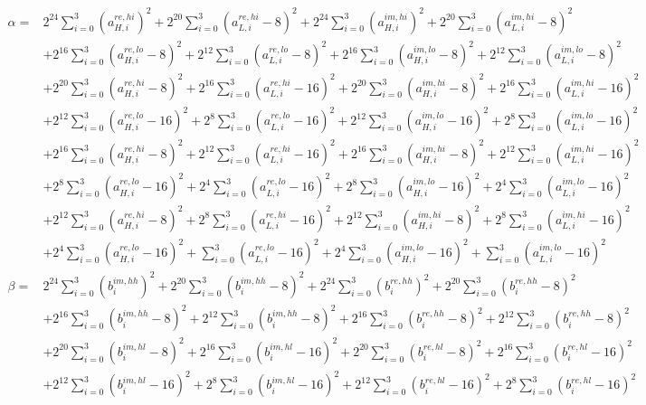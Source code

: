 \documentclass[fleqn]{article}
\begin{document}
{\[{\begin{aligned}
\alpha ={}& 2^{24}\!\sum_{i=0}^{3}(a_{H,i}^{re,hi})^2 + 2^{20}\!\sum_{i=0}^{3}(a_{L,i}^{re,hi}{-}8)^2 + 2^{24}\!\sum_{i=0}^{3}(a_{H,i}^{im,hi})^2 + 2^{20}\!\sum_{i=0}^{3}(a_{L,i}^{im,hi}{-}8)^2 \\
  & + 2^{16}\!\sum_{i=0}^{3}(a_{H,i}^{re,lo}{-}8)^2 + 2^{12}\!\sum_{i=0}^{3}(a_{L,i}^{re,lo}{-}8)^2 + 2^{16}\!\sum_{i=0}^{3}(a_{H,i}^{im,lo}{-}8)^2 + 2^{12}\!\sum_{i=0}^{3}(a_{L,i}^{im,lo}{-}8)^2 \\
  & + 2^{20}\!\sum_{i=0}^{3}(a_{H,i}^{re,hi}{-}8)^2 + 2^{16}\!\sum_{i=0}^{3}(a_{L,i}^{re,hi}{-}16)^2 + 2^{20}\!\sum_{i=0}^{3}(a_{H,i}^{im,hi}{-}8)^2 + 2^{16}\!\sum_{i=0}^{3}(a_{L,i}^{im,hi}{-}16)^2 \\
  & + 2^{12}\!\sum_{i=0}^{3}(a_{H,i}^{re,lo}{-}16)^2 + 2^{8}\!\sum_{i=0}^{3}(a_{L,i}^{re,lo}{-}16)^2 + 2^{12}\!\sum_{i=0}^{3}(a_{H,i}^{im,lo}{-}16)^2 + 2^{8}\!\sum_{i=0}^{3}(a_{L,i}^{im,lo}{-}16)^2 \\
  & + 2^{16}\!\sum_{i=0}^{3}(a_{H,i}^{re,hi}{-}8)^2 + 2^{12}\!\sum_{i=0}^{3}(a_{L,i}^{re,hi}{-}16)^2 + 2^{16}\!\sum_{i=0}^{3}(a_{H,i}^{im,hi}{-}8)^2 + 2^{12}\!\sum_{i=0}^{3}(a_{L,i}^{im,hi}{-}16)^2 \\
  & + 2^{8}\!\sum_{i=0}^{3}(a_{H,i}^{re,lo}{-}16)^2 + 2^{4}\!\sum_{i=0}^{3}(a_{L,i}^{re,lo}{-}16)^2 + 2^{8}\!\sum_{i=0}^{3}(a_{H,i}^{im,lo}{-}16)^2 + 2^{4}\!\sum_{i=0}^{3}(a_{L,i}^{im,lo}{-}16)^2 \\
  & + 2^{12}\!\sum_{i=0}^{3}(a_{H,i}^{re,hi}{-}8)^2 + 2^{8}\!\sum_{i=0}^{3}(a_{L,i}^{re,hi}{-}16)^2 + 2^{12}\!\sum_{i=0}^{3}(a_{H,i}^{im,hi}{-}8)^2 + 2^{8}\!\sum_{i=0}^{3}(a_{L,i}^{im,hi}{-}16)^2 \\
  & + 2^{4}\!\sum_{i=0}^{3}(a_{H,i}^{re,lo}{-}16)^2 + \sum_{i=0}^{3}(a_{L,i}^{re,lo}{-}16)^2 + 2^{4}\!\sum_{i=0}^{3}(a_{H,i}^{im,lo}{-}16)^2 + \sum_{i=0}^{3}(a_{L,i}^{im,lo}{-}16)^2 \\[0.35em]
\beta ={}& 2^{24}\!\sum_{i=0}^{3}(b_i^{im,hh})^2 + 2^{20}\!\sum_{i=0}^{3}(b_i^{im,hh}{-}8)^2 + 2^{24}\!\sum_{i=0}^{3}(b_i^{re,hh})^2 + 2^{20}\!\sum_{i=0}^{3}(b_i^{re,hh}{-}8)^2 \\
  & + 2^{16}\!\sum_{i=0}^{3}(b_i^{im,hh}{-}8)^2 + 2^{12}\!\sum_{i=0}^{3}(b_i^{im,hh}{-}8)^2 + 2^{16}\!\sum_{i=0}^{3}(b_i^{re,hh}{-}8)^2 + 2^{12}\!\sum_{i=0}^{3}(b_i^{re,hh}{-}8)^2 \\
  & + 2^{20}\!\sum_{i=0}^{3}(b_i^{im,hl}{-}8)^2 + 2^{16}\!\sum_{i=0}^{3}(b_i^{im,hl}{-}16)^2 + 2^{20}\!\sum_{i=0}^{3}(b_i^{re,hl}{-}8)^2 + 2^{16}\!\sum_{i=0}^{3}(b_i^{re,hl}{-}16)^2 \\
  & + 2^{12}\!\sum_{i=0}^{3}(b_i^{im,hl}{-}16)^2 + 2^{8}\!\sum_{i=0}^{3}(b_i^{im,hl}{-}16)^2 + 2^{12}\!\sum_{i=0}^{3}(b_i^{re,hl}{-}16)^2 + 2^{8}\!\sum_{i=0}^{3}(b_i^{re,hl}{-}16)^2 \\

\end{aligned}}\]}
\end{document}

